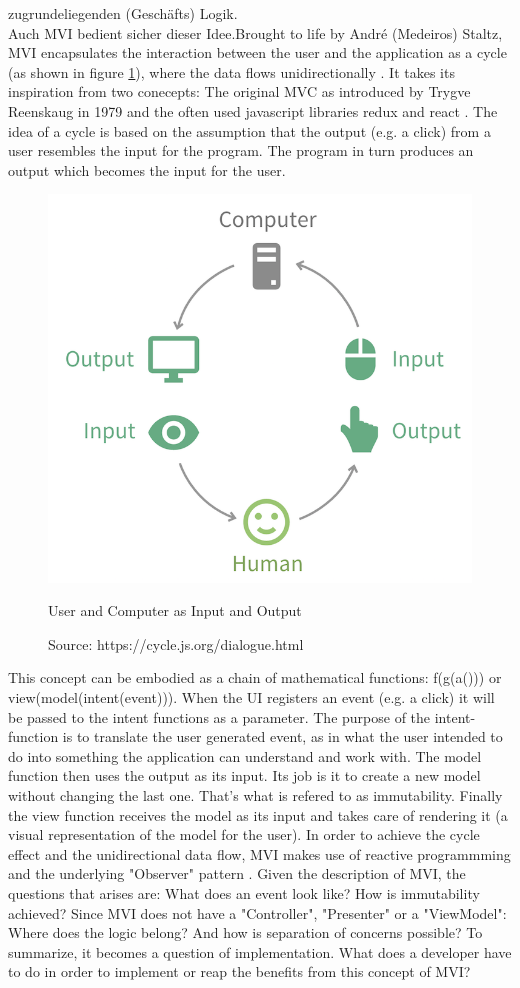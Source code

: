 zugrundeliegenden (Geschäfts) Logik. 
\\
Auch MVI bedient sicher dieser Idee.Brought to life by André (Medeiros) Staltz, MVI encapsulates the interaction between the user and the application as a cycle 
(as shown in figure \ref{fig:userComputerInputOutput}), where the data flows unidirectionally \cite{unidirectionalDataFlowRedux}.
It takes its inspiration from two conecepts: The original MVC as introduced by Trygve Reenskaug in 1979 \cite{wikipediaTrygveReenskaug} and the often used 
javascript libraries redux \cite{redux} and react \cite{react}. 
The idea of a cycle is based on the assumption that the output (e.g. a click) from a user resembles the input for the program. The program in turn produces an output 
which becomes the input for the user.
\begin{figure}[ht]
    \centering
    \includegraphics[height=0.5\textwidth]{./images/mvi-cycle}
    \caption{User and Computer as Input and Output}
    \caption*{Source: https://cycle.js.org/dialogue.html}
    \label{fig:userComputerInputOutput}
\end{figure}
This concept can be embodied as a chain of mathematical functions: f(g(a())) or view(model(intent(event))).
When the UI registers an event (e.g. a click) it will be passed to the intent functions as a parameter. The purpose of the intent-function is 
to translate the user generated event, as in what the user intended to do into something the application can understand and work with.
The model function then uses the output as its input. Its job is it to create a new model without changing the last one. That's what is refered to as immutability. 
\cite{immutableObjectsEffectiveJava}
Finally the view function receives the model as its input and takes care of rendering it (a visual representation of the model for the user). 
In order to achieve the cycle effect and the unidirectional data flow, MVI makes use of reactive programmming \cite{reactiveProgrammingIntroAndreStaltz} and 
the underlying "Observer" pattern \cite{wikipediaObserverPattern}.
Given the description of MVI, the questions that arises are: What does an event look like? How is immutability achieved?
Since MVI does not have a "Controller", "Presenter" or a "ViewModel": Where does the logic belong? And how is separation of concerns possible?
To summarize, it becomes a question of implementation. What does a developer have to do in order to implement or reap the benefits from this concept of MVI?

